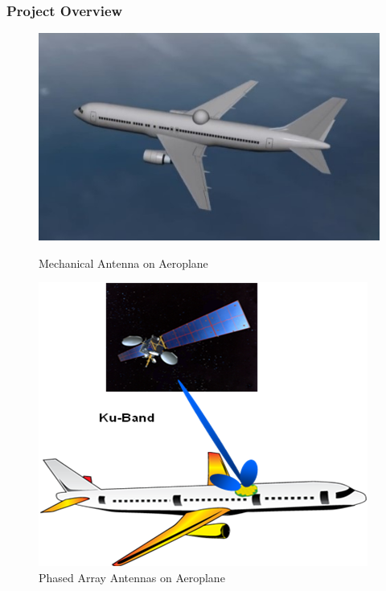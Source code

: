 \documentclass{beamer}
\begin{document}
\begin{frame}\frametitle{Project Overview}
	
	\begin{figure}[H]
	\begin{minipage}[t]{0.45\textwidth}
	\centering
	\includegraphics[width=\linewidth]{images/past_antenna}
	\caption{Mechanical Antenna on Aeroplane}
	\label{fig:past_antenna}
	\end{minipage}
	\hspace{\fill}
	\begin{minipage}[t]{0.45\textwidth}
	\centering
	\includegraphics[width=\linewidth]{images/satrax_plane}
	\caption{Phased Array Antennas on Aeroplane}
	\label{fig:satrax_plane}
	
	\end{minipage}
	\end{figure}
	
\end{frame}
\end{document}
